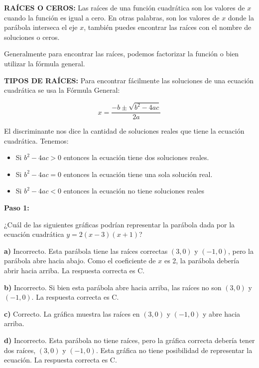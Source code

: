 \documentclass[12pt,a4paper]{article}
\begin{document}
\begin{tcolorbox}[colback=fondorosa,colframe=rojoclaro,title=\textbf{Mini-explicación: Elementos en la gráfica},breakable]
\textbf{RAÍCES O CEROS:} Las raíces de una función cuadrática son los valores de $x$ cuando la función es igual a cero. En otras palabras, son los valores de $x$ donde la parábola interseca el eje $x$, también puedes encontrar las raíces con el nombre de soluciones o ceros.

Generalmente para encontrar las raíces, podemos factorizar la función o bien utilizar la fórmula general.

\textbf{TIPOS DE RAÍCES:} Para encontrar fácilmente las soluciones de una ecuación cuadrática se usa la Fórmula General:

$$x = \frac{-b \pm \sqrt{b^2 - 4ac}}{2a}$$

El discriminante nos dice la cantidad de soluciones reales que tiene la ecuación cuadrática. Tenemos:

\begin{itemize}
\item Si $b^2 - 4ac > 0$ entonces la ecuación tiene dos soluciones reales.
\item Si $b^2 - 4ac = 0$ entonces la ecuación tiene una sola solución real.
\item Si $b^2 - 4ac < 0$ entonces la ecuación no tiene soluciones reales
\end{itemize}

\end{tcolorbox}

\vspace{5mm}


\textbf{Paso 1:}

¿Cuál de las siguientes gráficas podrían representar la parábola dada por la ecuación cuadrática $y = 2(x - 3)(x + 1)$?

\textbf{a)} Incorrecto. Esta parábola tiene las raíces correctas $(3,0)$ y $(-1, 0)$, pero la parábola abre hacia abajo. Como el coeficiente de $x$ es 2, la parábola debería abrir hacia arriba. La respuesta correcta es C.

\textbf{b)} Incorrecto. Si bien esta parábola abre hacia arriba, las raíces no son $(3, 0)$ y $(-1, 0)$. La respuesta correcta es C.

\textbf{c)} Correcto. La gráfica muestra las raíces en $(3, 0)$ y $(-1, 0)$ y abre hacia arriba.

\textbf{d)} Incorrecto. Esta parábola no tiene raíces, pero la gráfica correcta debería tener dos raíces, $(3, 0)$ y $(-1, 0)$. Esta gráfica no tiene posibilidad de representar la ecuación. La respuesta correcta es C.
\end{document}
